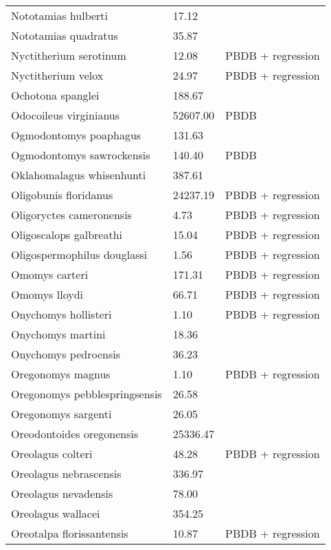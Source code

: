 \documentclass{article}
\begin{document}
\begin{center}
\begin{longtable}{p{} p{} p{}}
    Nototamias hulberti & 17.12 & \cite{Tomiya2013} \\ 
    Nototamias quadratus & 35.87 & \cite{Tomiya2013} \\ 
    Nyctitherium serotinum & 12.08 & PBDB + regression \\ 
    Nyctitherium velox & 24.97 & PBDB + regression \\ 
    Ochotona spanglei & 188.67 & \cite{Tomiya2013} \\ 
    Odocoileus virginianus & 52607.00 & PBDB \\ 
    Ogmodontomys poaphagus & 131.63 & \cite{Tomiya2013} \\ 
    Ogmodontomys sawrockensis & 140.40 & PBDB \\ 
    Oklahomalagus whisenhunti & 387.61 & \cite{Tomiya2013} \\ 
    Oligobunis floridanus & 24237.19 & PBDB + regression \\ 
    Oligoryctes cameronensis & 4.73 & PBDB + regression \\ 
    Oligoscalops galbreathi & 15.04 & PBDB + regression \\ 
    Oligospermophilus douglassi & 1.56 & PBDB + regression \\ 
    Omomys carteri & 171.31 & PBDB + regression \\ 
    Omomys lloydi & 66.71 & PBDB + regression \\ 
    Onychomys hollisteri & 1.10 & PBDB + regression \\ 
    Onychomys martini & 18.36 & \cite{Tomiya2013} \\ 
    Onychomys pedroensis & 36.23 & \cite{Tomiya2013} \\ 
    Oregonomys magnus & 1.10 & PBDB + regression \\ 
    Oregonomys pebblespringsensis & 26.58 & \cite{Tomiya2013} \\ 
    Oregonomys sargenti & 26.05 & \cite{Tomiya2013} \\ 
    Oreodontoides oregonensis & 25336.47 & \cite{Tomiya2013} \\ 
    Oreolagus colteri & 48.28 & PBDB + regression \\ 
    Oreolagus nebrascensis & 336.97 & \cite{Tomiya2013} \\ 
    Oreolagus nevadensis & 78.00 & \cite{McKenna2011} \\ 
    Oreolagus wallacei & 354.25 & \cite{Tomiya2013} \\ 
    Oreotalpa florissantensis & 10.87 & PBDB + regression \\ 

\end{longtable}
\end{center}
\end{document}
